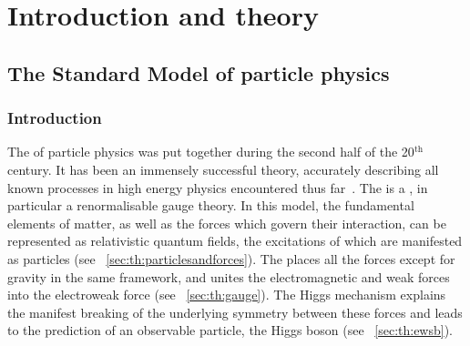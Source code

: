\chapter{Introduction and theory}
\label{chap:theory}

\section{The Standard Model of particle physics}
\subsection{Introduction}

The \SM of particle physics was put together during the second half of the 20$^{\text{th}}$ century. It has been an immensely successful theory, accurately describing all known processes in high energy physics encountered thus far~\cite{PDGBooklet}. The \SM is a \QFT, in particular a renormalisable gauge theory. In this model, the fundamental elements of matter, as well as the forces which govern their interaction, can be represented as relativistic quantum fields, the excitations of which are manifested as particles (see \Sec~\ref{sec:th:particlesandforces}). The \SM places all the forces except for gravity in the same framework, and unites the electromagnetic and weak forces into the electroweak force (see \Sec~\ref{sec:th:gauge}). The Higgs mechanism explains the manifest breaking of the underlying symmetry between these forces and leads to the prediction of an observable particle, the Higgs boson (see \Sec~\ref{sec:th:ewsb}). %





